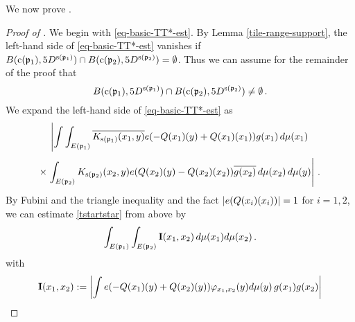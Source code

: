 We now prove .
\begin{proof}[Proof of ]
    \leanok
We begin with \eqref{eq-basic-TT*-est}.
By Lemma \ref{tile-range-support}, the left-hand side of \eqref{eq-basic-TT*-est} vanishes if
$B({\mathrm{c}}({\mathfrak p}_1),5D^{{\mathrm{s}}({\mathfrak p}_1)}) \cap B({\mathrm{c}}({\mathfrak p}_2),5D^{{\mathrm{s}}({\mathfrak p}_2)}) = \emptyset$.
Thus we can assume for the remainder of the proof that
\begin{equation}
        \label{intersec5B}
        B({\mathrm{c}}({\mathfrak p}_1),5D^{{\mathrm{s}}({\mathfrak p}_1)}) \cap B({\mathrm{c}}({\mathfrak p}_2),5D^{{\mathrm{s}}({\mathfrak p}_2)}) \neq \emptyset\,.
\end{equation}
We expand the left-hand side of \eqref{eq-basic-TT*-est} as
\begin{equation}\label{tstartstar}
\left|\int \int_{E({\mathfrak p}_1)} \overline{K_{{\mathrm{s}}({\mathfrak p}_1)}(x_1,y)}e(-{Q}(x_1)(y)+
    {Q}(x_1)(x_1))g(x_1)\, d\mu(x_1) \right.
\end{equation}
\begin{equation}
 \times \left.\int_{E({\mathfrak p}_2)} {K_{{\mathrm{s}}({\mathfrak p}_2)}(x_2,y)}e({Q}(x_2)(y)
    -{Q}(x_2)(x_2))\overline{g(x_2)}\, d\mu(x_2)\, d\mu(y)\right|\, .
\end{equation}
By Fubini and the triangle inequality and
the fact $|e({Q}(x_i)(x_i))|=1$ for $i=1,2$, we can estimate
\eqref{tstartstar} from above by
\begin{equation}\label{eqa1}
    \int_{E({\mathfrak p}_1)} \int_{E({\mathfrak p}_2)} {\bf I}(x_1, x_2)\, d\mu(x_1)d\mu(x_2)\,.
\end{equation}
with
\begin{equation}
    {\bf I}(x_1, x_2):=
    \left|\int
    e(-{Q}(x_1)(y)+{Q}(x_2)(y))\varphi_{x_1,x_2}(y)
    d\mu(y) \, g(x_1)g(x_2)\right|
\end{equation}



\end{proof}
